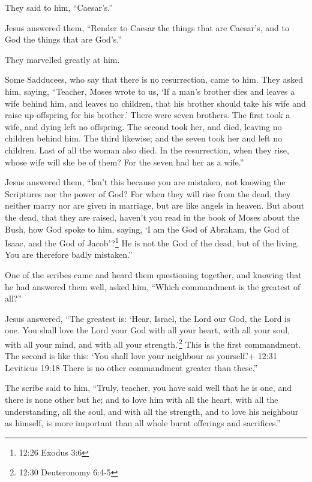 They said to him, ``Caesar's.''

 Jesus answered them, ``Render to Caesar the things that
are Caesar's, and to God the things that are God's.''

They marvelled greatly at him.

 Some Sadducees, who say that there is no resurrection,
came to him. They asked him, saying,  ``Teacher, Moses
wrote to us, `If a man's brother dies and leaves a wife behind him, and
leaves no children, that his brother should take his wife and raise up
offspring for his brother.'  There were seven brothers. The
first took a wife, and dying left no offspring.  The second
took her, and died, leaving no children behind him. The third likewise;
 and the seven took her and left no children. Last of all
the woman also died.  In the resurrection, when they rise,
whose wife will she be of them? For the seven had her as a wife.''

 Jesus answered them, ``Isn't this because you are
mistaken, not knowing the Scriptures nor the power of God? 
For when they will rise from the dead, they neither marry nor are given
in marriage, but are like angels in heaven.  But about the
dead, that they are raised, haven't you read in the book of Moses about
the Bush, how God spoke to him, saying, `I am the God of Abraham, the
God of Isaac, and the God of Jacob'?\footnote{12:26 Exodus 3:6}
 He is not the God of the dead, but of the living. You are
therefore badly mistaken.''

 One of the scribes came and heard them questioning
together, and knowing that he had answered them well, asked him, ``Which
commandment is the greatest of all?''

 Jesus answered, ``The greatest is: `Hear, Israel, the Lord
our God, the Lord is one.  You shall love the Lord your God
with all your heart, with all your soul, with all your mind, and with
all your strength.'\footnote{12:30 Deuteronomy 6:4-5} This is the first
commandment.  The second is like this: `You shall love your
neighbour as yourself.'+ 12:31 Leviticus 19:18 There is no other
commandment greater than these.''

 The scribe said to him, ``Truly, teacher, you have said
well that he is one, and there is none other but he;  and
to love him with all the heart, with all the understanding, all the
soul, and with all the strength, and to love his neighbour as himself,
is more important than all whole burnt offerings and sacrifices.''

